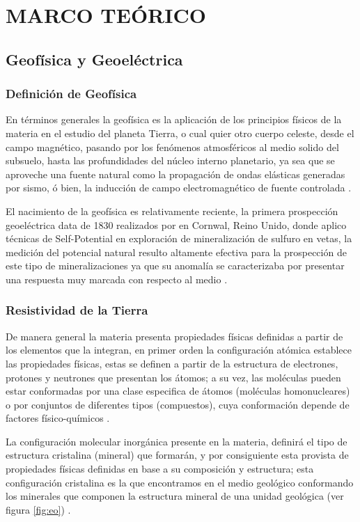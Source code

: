 \chapter{MARCO TEÓRICO}
	\section{Geofísica y Geoeléctrica}
		\subsection{Definición de Geofísica}
			
			En términos generales la geofísica es la aplicación de los principios físicos de la materia en el estudio del planeta Tierra, o cual quier otro cuerpo celeste, desde el campo magnético, pasando por los fenómenos atmosféricos al medio solido del subsuelo, hasta las profundidades del núcleo interno planetario, ya sea que se aproveche una fuente natural como la propagación de ondas elásticas generadas por sismo, ó bien, la inducción de campo electromagnético de fuente controlada \citep{parasnis2012, reynolds2011, lay1995}.   
		
			El  nacimiento de la geofísica es relativamente reciente, la primera prospección geoeléctrica data de 1830 realizados por \cite{fox1830} en Cornwal, Reino Unido, donde aplico técnicas de Self-Potential en exploración de mineralización de sulfuro en vetas, la medición del potencial natural resulto altamente efectiva para la prospección de este tipo de mineralizaciones ya que su anomalía se caracterizaba por presentar una respuesta muy marcada con respecto al medio \citep{reynolds2011, revil2013}.
			
		\subsection{Resistividad de la Tierra}
				
			De manera general la materia presenta propiedades físicas definidas a partir de los elementos que la integran, en primer orden la configuración atómica establece las propiedades físicas, estas se definen a partir de la estructura de electrones, protones y neutrones que presentan los átomos; a su vez, las moléculas pueden estar conformadas por una clase especifica de átomos (moléculas homonucleares) o por conjuntos de diferentes tipos (compuestos), cuya conformación depende de factores físico-químicos \citep{tiab2024}.
			
			La configuración molecular inorgánica presente en la materia, definirá el tipo de estructura cristalina (mineral) que formarán, y por consiguiente esta provista de propiedades físicas definidas en base a su composición y estructura; esta configuración cristalina es la que encontramos en el medio geológico conformando los minerales que componen la estructura mineral de una unidad geológica (ver figura \ref{fig:eo}) \citep{gandhi2016, tiab2024}.\\
			

